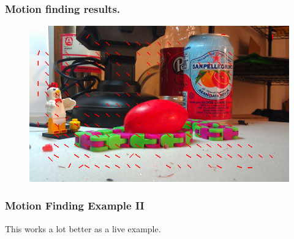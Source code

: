 \documentclass{beamer}
\begin{document}
\begin{frame}
\frametitle{Motion finding results.}
 \begin{figure}
     \includegraphics[width=0.7\linewidth]{motion.png}
 \end{figure}
\end{frame}
\begin{frame}[fragile] 
\frametitle{Motion Finding Example II}
This works a lot better as a live example. 
\begin{example}[MotionExample.py]
 \inputminted[linenos=true, tabsize=4,
 fontsize=\tiny]{python}{MotionExample.py}
\end{example}
\end{frame} 
\end{document}
